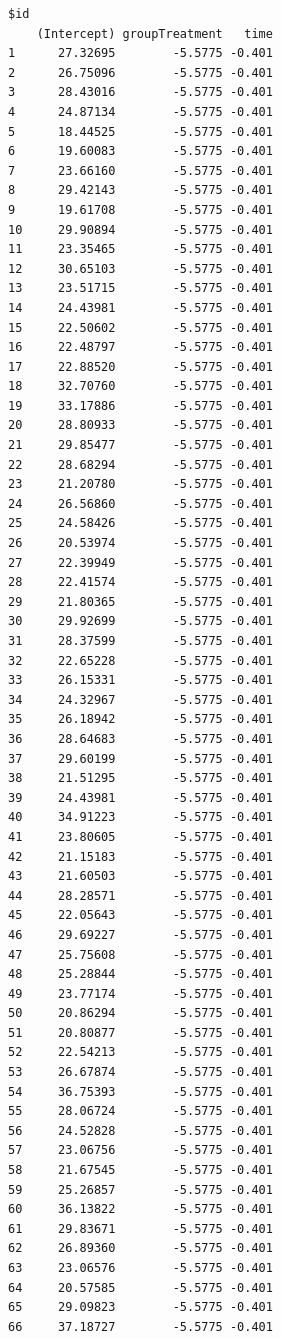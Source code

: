 \documentclass[
  letterpaper,
  DIV=11,
  numbers=noendperiod]{scrreprt}
\begin{document}
\begin{verbatim}
$id
    (Intercept) groupTreatment   time
1      27.32695        -5.5775 -0.401
2      26.75096        -5.5775 -0.401
3      28.43016        -5.5775 -0.401
4      24.87134        -5.5775 -0.401
5      18.44525        -5.5775 -0.401
6      19.60083        -5.5775 -0.401
7      23.66160        -5.5775 -0.401
8      29.42143        -5.5775 -0.401
9      19.61708        -5.5775 -0.401
10     29.90894        -5.5775 -0.401
11     23.35465        -5.5775 -0.401
12     30.65103        -5.5775 -0.401
13     23.51715        -5.5775 -0.401
14     24.43981        -5.5775 -0.401
15     22.50602        -5.5775 -0.401
16     22.48797        -5.5775 -0.401
17     22.88520        -5.5775 -0.401
18     32.70760        -5.5775 -0.401
19     33.17886        -5.5775 -0.401
20     28.80933        -5.5775 -0.401
21     29.85477        -5.5775 -0.401
22     28.68294        -5.5775 -0.401
23     21.20780        -5.5775 -0.401
24     26.56860        -5.5775 -0.401
25     24.58426        -5.5775 -0.401
26     20.53974        -5.5775 -0.401
27     22.39949        -5.5775 -0.401
28     22.41574        -5.5775 -0.401
29     21.80365        -5.5775 -0.401
30     29.92699        -5.5775 -0.401
31     28.37599        -5.5775 -0.401
32     22.65228        -5.5775 -0.401
33     26.15331        -5.5775 -0.401
34     24.32967        -5.5775 -0.401
35     26.18942        -5.5775 -0.401
36     28.64683        -5.5775 -0.401
37     29.60199        -5.5775 -0.401
38     21.51295        -5.5775 -0.401
39     24.43981        -5.5775 -0.401
40     34.91223        -5.5775 -0.401
41     23.80605        -5.5775 -0.401
42     21.15183        -5.5775 -0.401
43     21.60503        -5.5775 -0.401
44     28.28571        -5.5775 -0.401
45     22.05643        -5.5775 -0.401
46     29.69227        -5.5775 -0.401
47     25.75608        -5.5775 -0.401
48     25.28844        -5.5775 -0.401
49     23.77174        -5.5775 -0.401
50     20.86294        -5.5775 -0.401
51     20.80877        -5.5775 -0.401
52     22.54213        -5.5775 -0.401
53     26.67874        -5.5775 -0.401
54     36.75393        -5.5775 -0.401
55     28.06724        -5.5775 -0.401
56     24.52828        -5.5775 -0.401
57     23.06756        -5.5775 -0.401
58     21.67545        -5.5775 -0.401
59     25.26857        -5.5775 -0.401
60     36.13822        -5.5775 -0.401
61     29.83671        -5.5775 -0.401
62     26.89360        -5.5775 -0.401
63     23.06576        -5.5775 -0.401
64     20.57585        -5.5775 -0.401
65     29.09823        -5.5775 -0.401
66     37.18727        -5.5775 -0.401

\end{verbatim}
\end{document}
